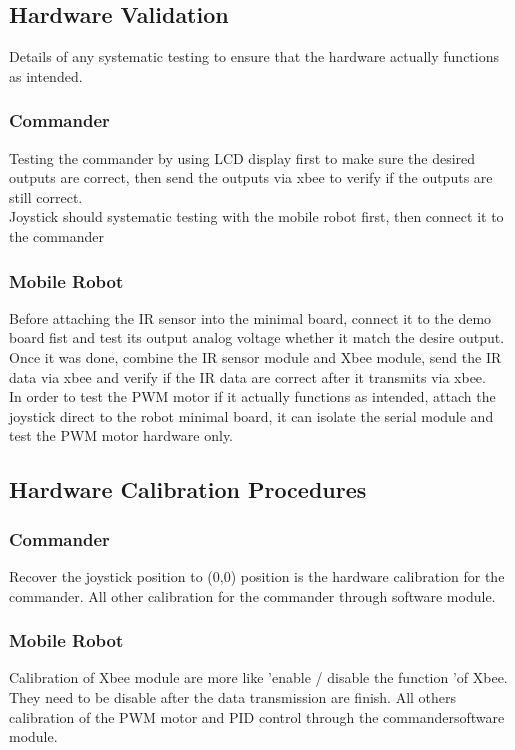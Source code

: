 \documentclass[11pt,a4paper]{article}
\begin{document}
  \subsection{Hardware Validation}
  Details of any systematic testing to ensure that the hardware actually functions as intended.
    \subsubsection{Commander}
    Testing the commander by using LCD display first to make sure the desired outputs are correct, then send the outputs via xbee to verify if the outputs are still correct. \\
    Joystick should systematic testing with the mobile robot first, then connect it to the commander\\
    \subsubsection{Mobile Robot}
    Before attaching the IR sensor into the minimal board, connect it to the demo board fist and test its output analog  voltage whether it match the desire output. Once it was done, combine the IR sensor module and Xbee module, send the IR data via xbee and verify if the IR data are correct after it transmits via xbee.\\
    In order to test the PWM motor if it actually functions as intended, attach the joystick direct to the robot minimal board, it can isolate the serial module and test the PWM motor hardware only. \\

  \subsection{Hardware Calibration Procedures}
    \subsubsection{Commander}
    Recover the joystick position to (0,0) position is the hardware calibration for the commander. All other calibration for the commander through software module.
    \subsubsection{Mobile Robot}
    Calibration of Xbee module are more like 'enable / disable the function 'of Xbee. They need to be disable after the data transmission are finish. All others calibration of the PWM motor and PID control through the commandersoftware module.
\end{document}
